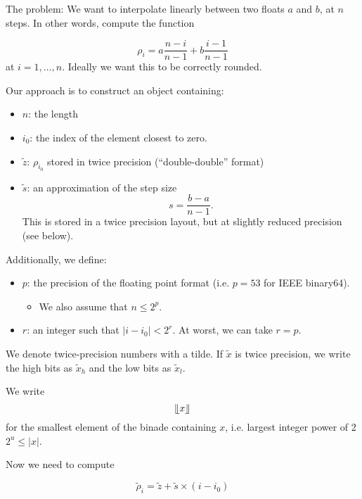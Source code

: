 \documentclass{article}
\begin{document}
The problem: We want to interpolate linearly between two floats $a$ and $b$, at $n$ steps. In other words, compute the function

\begin{equation*}
  \rho_i = a \frac{n-i}{n-1} + b \frac{i-1}{n-1}
\end{equation*}
at $i = 1,\ldots, n$. Ideally we want this to be correctly rounded.

Our approach is to construct an object containing:
\begin{itemize}
\item $n$: the length
\item $i_0$: the index of the element closest to zero.
\item $\tilde z$: $\rho_{i_0}$ stored in twice precision (``double-double'' format)
\item $\tilde s$: an approximation of the step size
  \begin{equation*}
    s = \frac{b-a}{n-1}.
  \end{equation*}
  This is stored in a twice precision layout, but at slightly reduced precision (see below).
\end{itemize}

Additionally, we define:
\begin{itemize}
\item $p$: the precision of the floating point format (i.e. $p=53$ for IEEE binary64).
  \begin{itemize}
  \item We also assume that $n \leq 2^p$.
  \end{itemize}
\item $r$: an integer such that $|i - i_0| < 2^r$. At worst, we can take $r = p$.
\end{itemize}

We denote twice-precision numbers with a tilde. If $\tilde x$ is twice precision, we write the high bits as $\tilde x_h$ and the low bits as $\tilde x_l$.

We write
\begin{equation*}
  \llfloor x \rrfloor
\end{equation*}
for the smallest element of the binade containing $x$, i.e. largest integer power of 2 $2^u \leq |x|$.

Now we need to compute

\begin{equation*}
  \tilde \rho_i = \tilde z + \tilde s \times (i - i_0)
\end{equation*}
\end{document}
